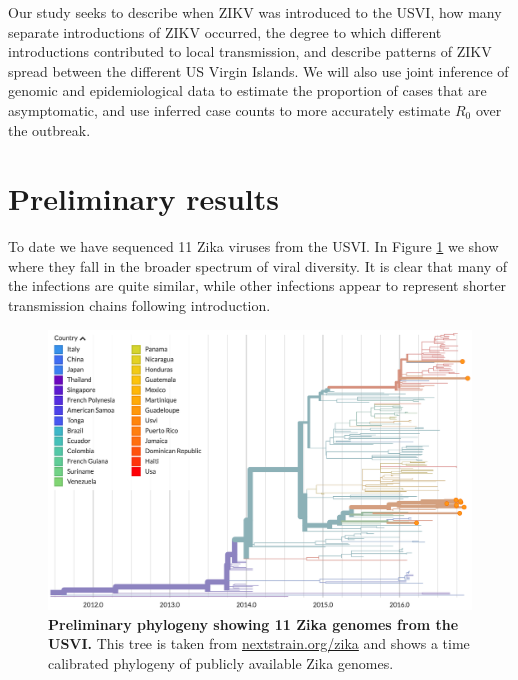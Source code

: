 \documentclass[11pt,oneside,letterpaper]{article}
\begin{document}
Our study seeks to describe when ZIKV was introduced to the USVI, how many separate introductions of ZIKV occurred, the degree to which different introductions contributed to local transmission, and describe patterns of ZIKV spread between the different US Virgin Islands.
We will also use joint inference of genomic and epidemiological data to estimate the proportion of cases that are asymptomatic, and use inferred case counts to more accurately estimate $R_0$ over the outbreak.

\section*{Preliminary results}

To date we have sequenced 11 Zika viruses from the USVI. In Figure \ref{zika_usvi_tree} we show where they fall in the broader spectrum of viral diversity.
It is clear that many of the infections are quite similar, while other infections appear to represent shorter transmission chains following introduction.

\begin{figure}[h]
	\centering
	\includegraphics[width=1.0\textwidth]{figures/zika_usvi_tree}
	\caption{\textbf{Preliminary phylogeny showing 11 Zika genomes from the USVI.}
	This tree is taken from \href{https://nextstrain.org/zika}{nextstrain.org/zika} and shows a time calibrated phylogeny of publicly available Zika genomes.
	}
	\label{zika_usvi_tree}
\end{figure}



\end{document}
